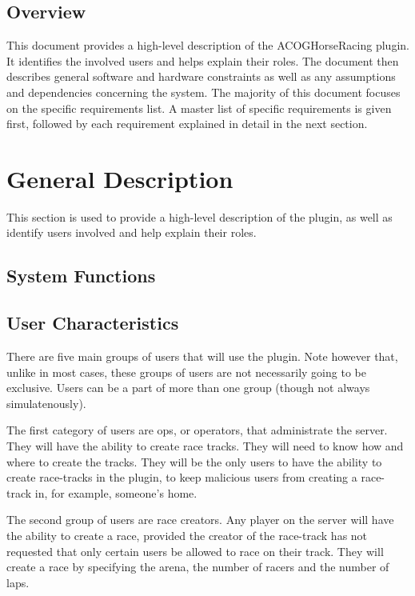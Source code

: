 \documentclass[a4paper, 11pt]{article} %
\begin{document}
\subsection{Overview}

This document provides a high-level description of the ACOGHorseRacing plugin. It identifies the involved users and helps explain their roles. The document then describes general software and hardware constraints as well as any assumptions and dependencies concerning the system. The majority of this document focuses on the specific requirements list. A master list of specific requirements is given first, followed by each requirement explained in detail in the next section.

\section{General Description}

This section is used to provide a high-level description of the plugin, as well as identify users involved and help explain their roles.

\subsection{System Functions}

\subsection{User Characteristics}

There are five main groups of users that will use the plugin. Note however that, unlike in most cases, these groups of users are not necessarily going to be exclusive. Users can be a part of more than one group (though not always simulatenously).

The first category of users are ops, or operators, that administrate the server. They will have the ability to create race tracks. They will need to know how and where to create the tracks. They will be the only users to have the ability to create race-tracks in the plugin, to keep malicious users from creating a race-track in, for example, someone's home.

The second group of users are race creators. Any player on the server will have the ability to create a race, provided the creator of the race-track has not requested that only certain users be allowed to race on their track. They will create a race by specifying the arena, the number of racers and the number of laps.
\end{document}
